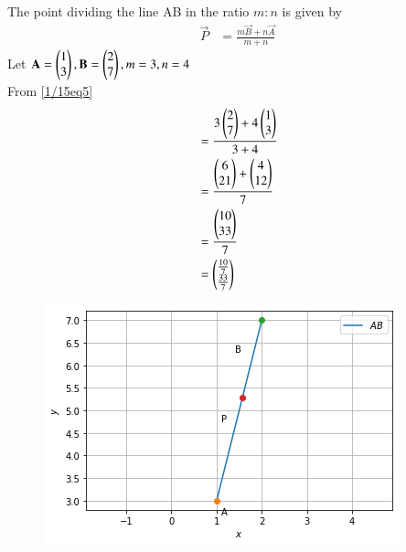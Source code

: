 The point  dividing the line AB in the ratio $m:n$ is given by
\begin{align}
	\vec{P} &=\frac{m \vec{B} + n \vec{A}}{m + n}
\label{1/15eq5}
\end{align}
Let $\mathbf{A}=\begin{pmatrix}1\\3\end{pmatrix}, \mathbf{B}=\begin{pmatrix}2\\7\end{pmatrix}, {m}=3, {n}=4$\\
From \eqref{1/15eq5}
\begin{align}
&=\frac{3\begin{pmatrix}2\\7\end{pmatrix}+4\begin{pmatrix}1\\3\end{pmatrix}}{3 + 4}\\
&=\frac{\begin{pmatrix}6\\21\end{pmatrix}+\begin{pmatrix}4\\12\end{pmatrix}}{7}\\
&=\frac{\begin{pmatrix}10\\33\end{pmatrix}}{7}\\
&=\begin{pmatrix}\frac{10}{7}\\\frac{33}{7}\end{pmatrix}
\end{align}

\begin{figure}[!ht]
	\centering 
\includegraphics[width=\columnwidth]{solutions/1/15/assignment3.png}
\caption{}
\label{1/15fig:Dividing Line}
\end{figure}
